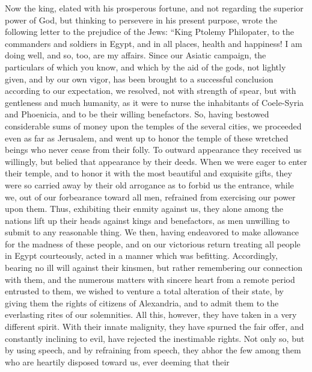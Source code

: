  Now the king, elated with his prosperous fortune, and
not regarding the superior power of God, but thinking to persevere in
his present purpose, wrote the following letter to the prejudice of the
Jews:  ``King Ptolemy Philopater, to the commanders and
soldiers in Egypt, and in all places, health and happiness!
 I am doing well, and so, too, are my affairs.
 Since our Asiatic campaign, the particulars of which you
know, and which by the aid of the gods, not lightly given, and by our
own vigor, has been brought to a successful conclusion according to our
expectation,  we resolved, not with strength of spear,
but with gentleness and much humanity, as it were to nurse the
inhabitants of Coele-Syria and Phoenicia, and to be their willing
benefactors.  So, having bestowed considerable sums of
money upon the temples of the several cities, we proceeded even as far
as Jerusalem, and went up to honor the temple of these wretched beings
who never cease from their folly.  To outward appearance
they received us willingly, but belied that appearance by their deeds.
When we were eager to enter their temple, and to honor it with the most
beautiful and exquisite gifts,  they were so carried away
by their old arrogance as to forbid us the entrance, while we, out of
our forbearance toward all men, refrained from exercising our power upon
them.  Thus, exhibiting their enmity against us, they
alone among the nations lift up their heads against kings and
benefactors, as men unwilling to submit to any reasonable thing.
 We then, having endeavored to make allowance for the
madness of these people, and on our victorious return treating all
people in Egypt courteously, acted in a manner which was befitting.
 Accordingly, bearing no ill will against their kinsmen,
but rather remembering our connection with them, and the numerous
matters with sincere heart from a remote period entrusted to them, we
wished to venture a total alteration of their state, by giving them the
rights of citizens of Alexandria, and to admit them to the everlasting
rites of our solemnities.  All this, however, they have
taken in a very different spirit. With their innate malignity, they have
spurned the fair offer, and constantly inclining to evil,
 have rejected the inestimable rights. Not only so, but
by using speech, and by refraining from speech, they abhor the few among
them who are heartily disposed toward us, ever deeming that their
